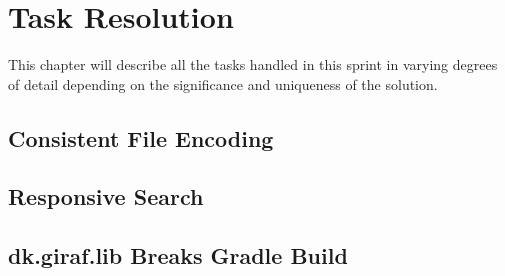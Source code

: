 \chapter{Task Resolution}
This chapter will describe all the tasks handled in this sprint in varying degrees of detail depending on the significance and uniqueness of the solution.


\section{Consistent File Encoding}
\section{Responsive Search}

\section{dk.giraf.lib Breaks Gradle Build}
